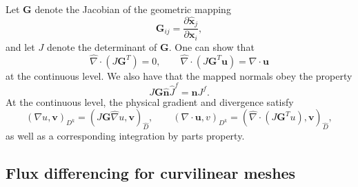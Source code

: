\documentclass[preprint,10pt]{article}
\theoremstyle{definition}
\theoremstyle{lemma}
\theoremstyle{theorem}
\theoremstyle{assumption}
\renewcommand{\hat}{\widehat}
\newcommand{\pd}[2]{\frac{\partial#1}{\partial#2}}
\newcommand{\LRp}[1]{\left( #1 \right)}
\newcommand{\Grad} {\ensuremath{\nabla}}
\begin{document}
Let $\bm{G}$ denote the Jacobian of the geometric mapping
\[
\bm{G}_{ij} = \pd{\hat{\bm{x}}_j}{\bm{x}_i},
\]
and let $J$ denote the determinant of $\bm{G}$.  One can show that
\[
\hat{\Grad} \cdot \LRp{J\bm{G}^T} = 0, \qquad \hat{\Grad} \cdot \LRp{J\bm{G}^T\bm{u}} = \Grad \cdot \bm{u}
\]
at the continuous level.  We also have that the mapped normals obey the property
\[
J\bm{G} \hat{\bm{n}}\hat{J}^f = \bm{n}J^f.
\]
At the continuous level, the physical gradient and divergence satisfy
\[
\LRp{\Grad u, \bm{v}}_{D^k} = \LRp{J\bm{G} \hat{\Grad} u,\bm{v}}_{\hat{D}}, \qquad \LRp{\Grad\cdot \bm{u},v}_{D^k} = \LRp{\hat{\Grad}\cdot \LRp{J\bm{G}^T u},\bm{v}}_{\hat{D}}, 
\]
as well as a corresponding integration by parts property.  

\subsection{Flux differencing for curvilinear meshes}
\end{document}
